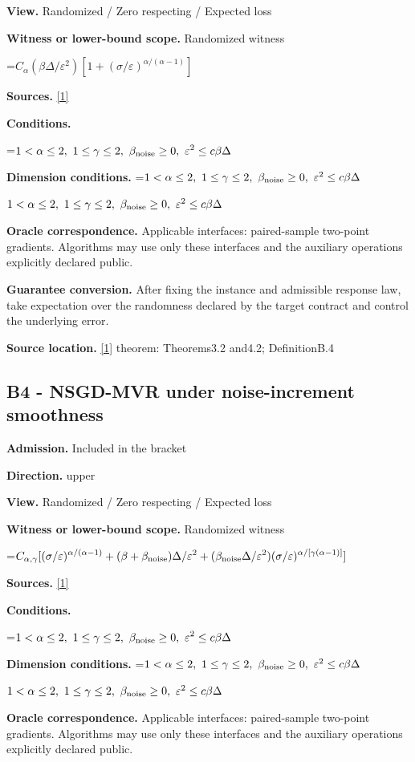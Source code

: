 \documentclass[10pt,a4paper]{article}
\newcommand{\AtlasMath}[1]{\par\begingroup\centering\setbox0=\hbox{$\displaystyle #1$}\ifdim\wd0>1.4\linewidth\typeout{ATLAS WIDE FORMULA: \the\wd0}\fi\ifdim\wd0>\linewidth\resizebox{\linewidth}{!}{\box0}\else\box0\fi\par\endgroup}
\newcommand{\AtlasInlineMath}[1]{\begingroup\setbox0=\hbox{$#1$}\ifdim\wd0>.4\linewidth\endgroup\AtlasMath{#1}\else\endgroup$#1$\fi}
\begin{document}
\textbf{View.} Randomized / Zero respecting / Expected loss

\textbf{Witness or lower-bound scope.} Randomized witness

\AtlasMath{C_\alpha (\beta\Delta/\varepsilon^2)[1+(\sigma/\varepsilon)^{\alpha/(\alpha-1)}]}
\textbf{Sources.} \href{https://arxiv.org/pdf/2512.18713}{[1]}

\textbf{Conditions.} 
\AtlasMath{1<\alpha\le2,\ 1\le\gamma\le2,\ \beta_{\rm noise}\ge0,\ \varepsilon^2\le c\beta\Delta}


\textbf{Dimension conditions.} \AtlasInlineMath{1<\alpha\le2,\ 1\le\gamma\le2,\ \beta_{\rm noise}\ge0,\ \varepsilon^2\le c\beta\Delta}

\textbf{Oracle correspondence.} Applicable interfaces: paired-sample two-point gradients. Algorithms may use only these interfaces and the auxiliary operations explicitly declared public.

\textbf{Guarantee conversion.} After fixing the instance and admissible response law, take expectation over the randomness declared by the target contract and control the underlying error.

\textbf{Source location.} \href{https://arxiv.org/pdf/2512.18713}{[1]} theorem: Theorems3.2 and4.2; DefinitionB.4

\subsection{B4 - NSGD-MVR under noise-increment smoothness}
\textbf{Admission.} Included in the bracket

\textbf{Direction.} upper

\textbf{View.} Randomized / Zero respecting / Expected loss

\textbf{Witness or lower-bound scope.} Randomized witness

\AtlasMath{C_{\alpha,\gamma}[(\sigma/\varepsilon)^{\alpha/(\alpha-1)}+(\beta+\beta_{\rm noise})\Delta/\varepsilon^2+(\beta_{\rm noise}\Delta/\varepsilon^2)(\sigma/\varepsilon)^{\alpha/[\gamma(\alpha-1)]}]}
\textbf{Sources.} \href{https://arxiv.org/pdf/2512.18713}{[1]}

\textbf{Conditions.} 
\AtlasMath{1<\alpha\le2,\ 1\le\gamma\le2,\ \beta_{\rm noise}\ge0,\ \varepsilon^2\le c\beta\Delta}


\textbf{Dimension conditions.} \AtlasInlineMath{1<\alpha\le2,\ 1\le\gamma\le2,\ \beta_{\rm noise}\ge0,\ \varepsilon^2\le c\beta\Delta}

\textbf{Oracle correspondence.} Applicable interfaces: paired-sample two-point gradients. Algorithms may use only these interfaces and the auxiliary operations explicitly declared public.
\end{document}
